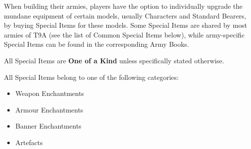 \tablespelltype{\hex}
\tablespellduration{\oneturn}
\spellrule
{}

\tablespelltype{\universal}
\tablespellduration{\oneturn}
\spellrule
{}

\tablespelltype{\hex}
\tablespellduration{\oneturn}

\closetable{}








\clearpage


When building their armies, players have the option to individually upgrade the mundane equipment of certain models, usually Characters and Standard Bearers, by buying Special Items for these models. Some Special Items are shared by most armies of T9A (see the list of Common Special Items below), while army-specific Special Items can be found in the corresponding Army Books.

All Special Items are \textbf{One of a Kind} unless specifically stated otherwise.


All Special Items belong to one of the following categories:

\begin{itemize}
\item Weapon Enchantments
\item Armour Enchantments
\item Banner Enchantments
\item Artefacts
\end{itemize}

